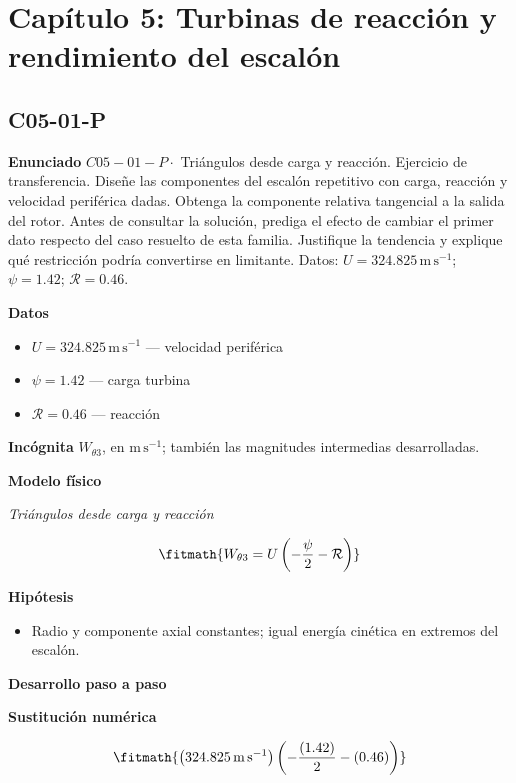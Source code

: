 \documentclass[10pt,openany]{book}
\begin{document}
\section{Capítulo 5: Turbinas de reacción y rendimiento del escalón}
\subsection*{C05-01-P}

\noindent\textbf{Enunciado}
\(C05-01-P \cdot\) Triángulos desde carga y reacción. Ejercicio de transferencia. Diseñe las componentes del escalón repetitivo con carga, reacción y velocidad periférica dadas. Obtenga la componente relativa tangencial a la salida del rotor. Antes de consultar la solución, prediga el efecto de cambiar el primer dato respecto del caso resuelto de esta familia. Justifique la tendencia y explique qué restricción podría convertirse en limitante. Datos: \(U=324.825\, \mathrm{m}\,\mathrm{s}^{-1}\); \(\psi=1.42\); \(\mathcal R=0.46\).

\noindent\textbf{Datos}
\begin{itemize}
\item $U = 324.825\,\mathrm{m}\,\mathrm{s}^{-1}$ — velocidad periférica
\item $\psi = 1.42$ — carga turbina
\item $\mathcal R = 0.46$ — reacción
\end{itemize}

\noindent\textbf{Incógnita}
$W_{\theta 3}$, en $\mathrm{m\,s^{-1}}$; también las magnitudes intermedias desarrolladas.

\noindent\textbf{Modelo físico}

\noindent\textit{Triángulos desde carga y reacción}

\[
\fitmath{W_{\theta 3}=U \left(- \frac{\psi}{2} - \mathcal R\right)}
\]

\noindent\textbf{Hipótesis}
\begin{itemize}
\item Radio y componente axial constantes; igual energía cinética en extremos del escalón.
\end{itemize}

\noindent\textbf{Desarrollo paso a paso}



\noindent\textbf{Sustitución numérica}

\[
\fitmath{\left(324.825\,\mathrm{m}\,\mathrm{s}^{-1}\right) \left(- \frac{\left(1.42\right)}{2} - \left(0.46\right)\right)}
\]
\end{document}
